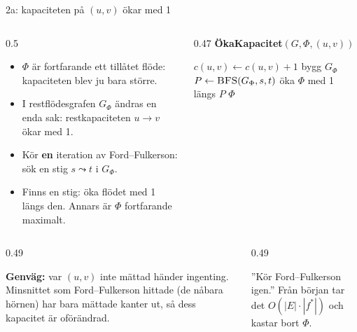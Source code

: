 \documentclass[11pt,aspectratio=169,xcolor=table,t]{beamer}
\begin{document}
\begin{frame}{2a: kapaciteten på $(u,v)$ ökar med 1}
\begin{columns}[T]
\begin{column}{0.5\textwidth}
\small
\begin{itemize}\setlength{\itemsep}{3pt}
  \item $\Phi$ är fortfarande ett tillåtet flöde: kapaciteten blev ju bara större.
  \item I restflödesgrafen $G_\Phi$ ändras en enda sak: restkapaciteten $u\to v$ ökar med 1.
  \item Kör \textbf{en} iteration av Ford--Fulkerson: sök en stig $s\leadsto t$ i $G_\Phi$.
  \item Finns en stig: öka flödet med 1 längs den. Annars är $\Phi$ fortfarande maximalt.
\end{itemize}
\end{column}
\begin{column}{0.47\textwidth}
{\small\bfseries\color{kthnavy}ÖkaKapacitet$(G,\Phi,(u,v))$}
\footnotesize
\begin{algorithmic}[1]
\State $c(u,v)\gets c(u,v)+1$
\State bygg $G_\Phi$ 
\State $P\gets\textsc{BFS}(G_\Phi,s,t)$ 
  \State öka $\Phi$ med 1 längs $P$ 
\EndIf
\State \Return $\Phi$
\end{algorithmic}
\end{column}
\end{columns}
\vfill
\begin{columns}[T]
\begin{column}{0.49\textwidth}
\begin{ahabox}[fontupper=\footnotesize]
\textbf{Genväg:} var $(u,v)$ inte mättad händer ingenting. Minsnittet som Ford--Fulkerson hittade
(de nåbara hörnen) har bara mättade kanter ut, så dess kapacitet är oförändrad.
\end{ahabox}
\end{column}
\begin{column}{0.49\textwidth}
\begin{missbox}[fontupper=\footnotesize]
”Kör Ford--Fulkerson igen.” Från början tar det $O(|E|\cdot|f^*|)$ och kastar bort $\Phi$.
\end{missbox}
\end{column}
\end{columns}
\end{frame}
\end{document}
